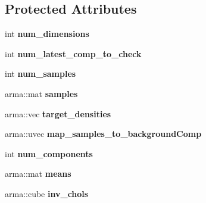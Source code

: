\subsection*{Protected Attributes}
\begin{DoxyCompactItemize}
\item 
int {\bfseries num\+\_\+dimensions}\hypertarget{classSampleDatabase_ad04c78bca974757aa2728460b9c8a836}{}\label{classSampleDatabase_ad04c78bca974757aa2728460b9c8a836}

\item 
int {\bfseries num\+\_\+latest\+\_\+comp\+\_\+to\+\_\+check}\hypertarget{classSampleDatabase_a07a7cd90ae7f6b9faa2f7ed228ea610b}{}\label{classSampleDatabase_a07a7cd90ae7f6b9faa2f7ed228ea610b}

\item 
int {\bfseries num\+\_\+samples}\hypertarget{classSampleDatabase_ac708e9898d20f820957afcb69c282618}{}\label{classSampleDatabase_ac708e9898d20f820957afcb69c282618}

\item 
arma\+::mat {\bfseries samples}\hypertarget{classSampleDatabase_aa1f521741803183aec5140167d9fbf36}{}\label{classSampleDatabase_aa1f521741803183aec5140167d9fbf36}

\item 
arma\+::vec {\bfseries target\+\_\+densities}\hypertarget{classSampleDatabase_a37680a91b533575f3d9adbe80b5df104}{}\label{classSampleDatabase_a37680a91b533575f3d9adbe80b5df104}

\item 
arma\+::uvec {\bfseries map\+\_\+samples\+\_\+to\+\_\+background\+Comp}\hypertarget{classSampleDatabase_a6dee618f017df3ce8cfc31b097310508}{}\label{classSampleDatabase_a6dee618f017df3ce8cfc31b097310508}

\item 
int {\bfseries num\+\_\+components}\hypertarget{classSampleDatabase_aa92541bbb40b1092d8f88907cd1f69b5}{}\label{classSampleDatabase_aa92541bbb40b1092d8f88907cd1f69b5}

\item 
arma\+::mat {\bfseries means}\hypertarget{classSampleDatabase_abf97526d7e8164c9f29b56ebc3ee3bcc}{}\label{classSampleDatabase_abf97526d7e8164c9f29b56ebc3ee3bcc}

\item 
arma\+::cube {\bfseries inv\+\_\+chols}\hypertarget{classSampleDatabase_a888d421279a6dff04d77d10551e48861}{}\label{classSampleDatabase_a888d421279a6dff04d77d10551e48861}

\end{DoxyCompactItemize}


